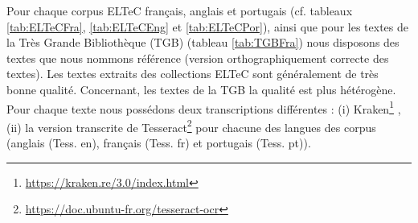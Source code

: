 Pour chaque corpus ELTeC français, anglais et portugais (cf. tableaux \ref{tab:ELTeCFra}, \ref{tab:ELTeCEng} et \ref{tab:ELTeCPor}), ainsi que pour les textes de la Très Grande Bibliothèque (TGB) (tableau \ref{tab:TGBFra}) nous disposons des textes que nous nommons \og{}référence\fg{} (version orthographiquement correcte des textes). Les textes extraits des collections ELTeC sont généralement de très bonne qualité. Concernant, les textes de la TGB la qualité est plus hétérogène. Pour chaque texte nous possédons deux transcriptions différentes : (i) Kraken\footnote{\url{https://kraken.re/3.0/index.html}} \cite{kiessling2019escriptorium}, (ii) la version transcrite de Tesseract\footnote{\url{https://doc.ubuntu-fr.org/tesseract-ocr}} pour chacune des langues des corpus (anglais (Tess. en), français (Tess. fr) et portugais (Tess. pt)).

